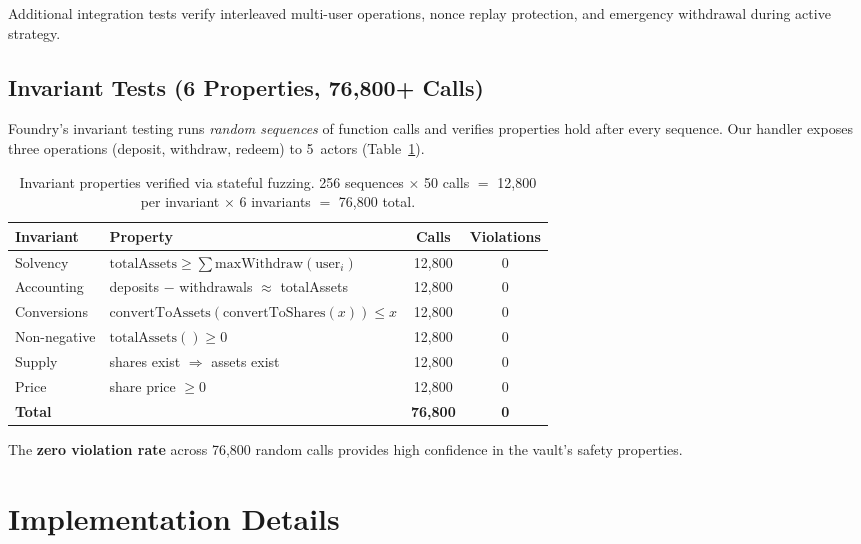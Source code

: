 \documentclass[12pt]{article}
\begin{document}
Additional integration tests verify interleaved multi-user operations, nonce replay protection, and emergency withdrawal during active strategy.

\subsection{Invariant Tests (6 Properties, 76{,}800+ Calls)}

Foundry's invariant testing runs \emph{random sequences} of function calls and verifies properties hold after every sequence.
Our handler exposes three operations (deposit, withdraw, redeem) to 5~actors (Table~\ref{tab:invariants}).

\begin{table}[H]
\centering
\caption{Invariant properties verified via stateful fuzzing.  256 sequences $\times$ 50 calls $=$ 12{,}800 per invariant $\times$ 6 invariants $=$ 76{,}800 total.}
\label{tab:invariants}
\small
\begin{tabular}{@{}llcc@{}}
\toprule
\textbf{Invariant} & \textbf{Property} & \textbf{Calls} & \textbf{Violations} \\
\midrule
Solvency       & $\text{totalAssets} \geq \sum \text{maxWithdraw}(\text{user}_i)$ & 12{,}800 & 0 \\
Accounting     & deposits $-$ withdrawals $\approx$ totalAssets              & 12{,}800 & 0 \\
Conversions    & $\text{convertToAssets}(\text{convertToShares}(x)) \leq x$  & 12{,}800 & 0 \\
Non-negative   & $\text{totalAssets}() \geq 0$                               & 12{,}800 & 0 \\
Supply         & shares exist $\Rightarrow$ assets exist                     & 12{,}800 & 0 \\
Price          & share price $\geq 0$                                        & 12{,}800 & 0 \\
\midrule
\textbf{Total} &                                                             & \textbf{76{,}800} & \textbf{0} \\
\bottomrule
\end{tabular}
\end{table}

The \textbf{zero violation rate} across 76{,}800 random calls provides high confidence in the vault's safety properties.

\section{Implementation Details}
\end{document}

